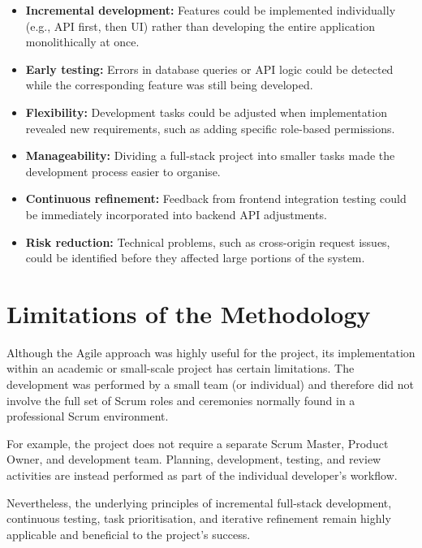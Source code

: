 \begin{itemize}
    \item \textbf{Incremental development:} Features could be implemented individually (e.g., API first, then UI) rather than developing the entire application monolithically at once.

    \item \textbf{Early testing:} Errors in database queries or API logic could be detected while the corresponding feature was still being developed.

    \item \textbf{Flexibility:} Development tasks could be adjusted when implementation revealed new requirements, such as adding specific role-based permissions.

    \item \textbf{Manageability:} Dividing a full-stack project into smaller tasks made the development process easier to organise.

    \item \textbf{Continuous refinement:} Feedback from frontend integration testing could be immediately incorporated into backend API adjustments.

    \item \textbf{Risk reduction:} Technical problems, such as cross-origin request issues, could be identified before they affected large portions of the system.
\end{itemize}

\section{Limitations of the Methodology}

Although the Agile approach was highly useful for the project, its implementation within an academic or small-scale project has certain limitations. The development was performed by a small team (or individual) and therefore did not involve the full set of Scrum roles and ceremonies normally found in a professional Scrum environment.

For example, the project does not require a separate Scrum Master, Product Owner, and development team. Planning, development, testing, and review activities are instead performed as part of the individual developer's workflow.

Nevertheless, the underlying principles of incremental full-stack development, continuous testing, task prioritisation, and iterative refinement remain highly applicable and beneficial to the project's success.

